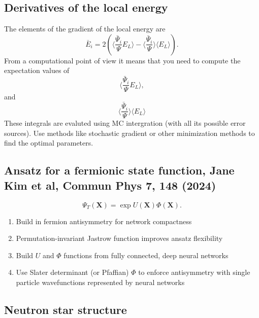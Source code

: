 \documentclass[%
oneside,                 %
final,                   %
10pt]{article}
\begin{document}
\subsection{Derivatives of the local energy}
\begin{block}{}
The elements of the gradient of the local energy are 
\[
\bar{E}_{i}= 2\left( \langle \frac{\bar{\Psi}_{i}}{\Psi}E_L\rangle -\langle \frac{\bar{\Psi}_{i}}{\Psi}\rangle\langle E_L \rangle\right).
\]
From a computational point of view it means that you need to compute the expectation values of 
\[
\langle \frac{\bar{\Psi}_{i}}{\Psi}E_L\rangle,
\]
and
\[
\langle \frac{\bar{\Psi}_{i}}{\Psi}\rangle\langle E_L\rangle
\]
These integrals are evaluted using MC intergration (with all its possible error sources). Use methods like stochastic gradient or other minimization methods to find the optimal parameters.
\end{block}

\subsection{Ansatz for a fermionic state function, Jane Kim et al, Commun Phys 7, 148 (2024)}

\[
\Psi_T(\bm{X}) =\exp{U(\bm{X})}\Phi(\bm{X}).
\]

\begin{block}{}
\begin{enumerate}
\item Build in fermion antisymmetry for network compactness

\item Permutation-invariant Jastrow function improves ansatz flexibility

\item Build $U$ and $\Phi$ functions from fully connected, deep neural networks

\item Use Slater determinant (or Pfaffian) $\Phi$ to enforce antisymmetry with single particle wavefunctions represented by neural networks
\end{enumerate}

\noindent
\end{block}

\subsection{Neutron star structure}

\vspace{6mm}
\end{document}
